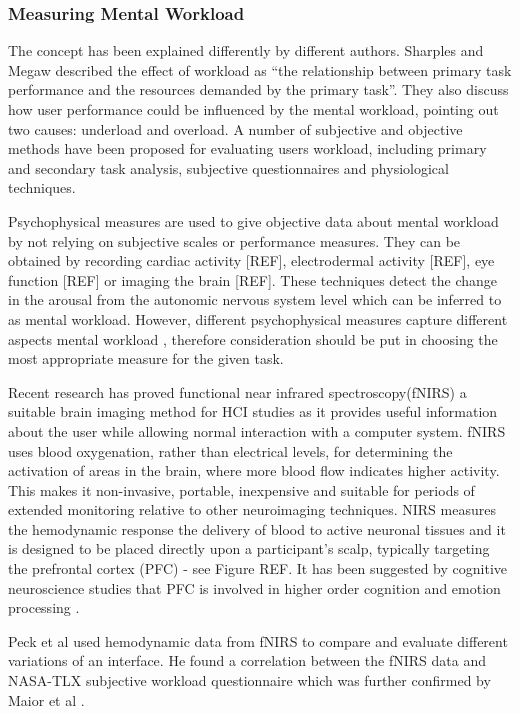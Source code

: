 \documentclass[../main/Feedback.tex]{subfiles}
\begin{document}
\subsubsection{Measuring Mental Workload}
The concept has been explained differently by different authors.
Sharples and Megaw \cite{wilsonChapter2015evaluation} described the effect of workload as ``the relationship between primary task performance and the resources demanded by the primary task''.
They also discuss how user performance could be influenced by the mental workload, pointing out two causes: underload and overload.
A number of subjective and objective methods have been proposed for evaluating users workload, including primary and secondary task analysis, subjective questionnaires and physiological techniques.

Psychophysical measures are used to give objective data about mental workload by not relying on subjective scales or performance measures.
They can be obtained by recording cardiac activity [REF], electrodermal activity [REF], eye function [REF] or imaging the brain [REF].
These techniques detect the  change in the arousal from the autonomic nervous system level which can be inferred to as mental workload.
However, different psychophysical measures capture different aspects mental workload \cite{cain2007review}, therefore consideration should be put in choosing the most appropriate measure for the given task.

Recent research has proved functional near infrared spectroscopy(fNIRS) a suitable brain imaging method for HCI studies \cite{maior2015examining,solovey2009using,pike2014measuring} as it provides useful information about the user while allowing normal interaction with a computer system.
fNIRS uses blood oxygenation, rather than electrical levels, for determining the activation of areas in the brain, where more blood flow indicates higher activity.
This makes it non-invasive, portable, inexpensive and suitable for periods of extended monitoring relative to other neuroimaging techniques.
NIRS measures the hemodynamic response the delivery of blood to active neuronal tissues and it is designed to be placed directly upon a participant's scalp, typically targeting the prefrontal cortex (PFC) - see Figure REF.
It has been suggested by cognitive neuroscience studies that PFC is involved in higher order cognition \cite{braver1997parametric} and emotion processing \cite{damasio1996somatic}.

Peck et al \cite{peck2013using} used hemodynamic data from fNIRS to compare and evaluate different variations of an interface.
He found a correlation between the fNIRS data and NASA-TLX subjective workload questionnaire which was further confirmed by Maior et al \cite{maior2014continuous}.
\end{document}
